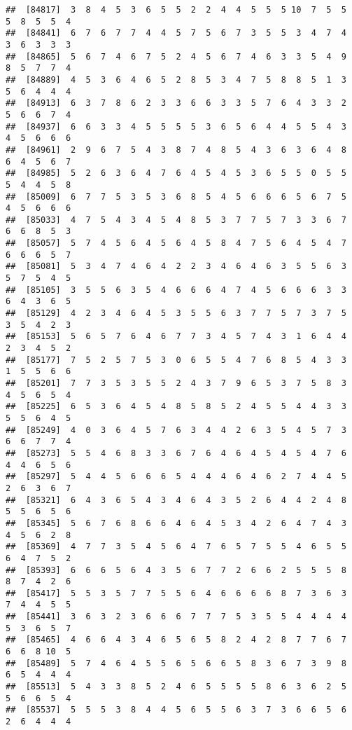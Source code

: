 \documentclass[
]{book}
\begin{document}
\begin{verbatim}
##  [84817]  3  8  4  5  3  6  5  5  2  2  4  4  5  5  5 10  7  5  5  5  8  5  5  4
##  [84841]  6  7  6  7  7  4  4  5  7  5  6  7  3  5  5  3  4  7  4  3  6  3  3  3
##  [84865]  5  6  7  4  6  7  5  2  4  5  6  7  4  6  3  3  5  4  9  8  5  7  7  4
##  [84889]  4  5  3  6  4  6  5  2  8  5  3  4  7  5  8  8  5  1  3  5  6  4  4  4
##  [84913]  6  3  7  8  6  2  3  3  6  6  3  3  5  7  6  4  3  3  2  5  6  6  7  4
##  [84937]  6  6  3  3  4  5  5  5  5  3  6  5  6  4  4  5  5  4  3  4  5  6  6  6
##  [84961]  2  9  6  7  5  4  3  8  7  4  8  5  4  3  6  3  6  4  8  6  4  5  6  7
##  [84985]  5  2  6  3  6  4  7  6  4  5  4  5  3  6  5  5  0  5  5  5  4  4  5  8
##  [85009]  6  7  7  5  3  5  3  6  8  5  4  5  6  6  6  5  6  7  5  4  5  6  6  6
##  [85033]  4  7  5  4  3  4  5  4  8  5  3  7  7  5  7  3  3  6  7  6  6  8  5  3
##  [85057]  5  7  4  5  6  4  5  6  4  5  8  4  7  5  6  4  5  4  7  6  6  6  5  7
##  [85081]  5  3  4  7  4  6  4  2  2  3  4  6  4  6  3  5  5  6  3  5  7  5  4  5
##  [85105]  3  5  5  6  3  5  4  6  6  6  4  7  4  5  6  6  6  3  3  6  4  3  6  5
##  [85129]  4  2  3  4  6  4  5  3  5  5  6  3  7  7  5  7  3  7  5  3  5  4  2  3
##  [85153]  5  6  5  7  6  4  6  7  7  3  4  5  7  4  3  1  6  4  4  2  3  4  5  2
##  [85177]  7  5  2  5  7  5  3  0  6  5  5  4  7  6  8  5  4  3  3  1  5  5  6  6
##  [85201]  7  7  3  5  3  5  5  2  4  3  7  9  6  5  3  7  5  8  3  4  5  6  5  4
##  [85225]  6  5  3  6  4  5  4  8  5  8  5  2  4  5  5  4  4  3  3  5  5  6  4  5
##  [85249]  4  0  3  6  4  5  7  6  3  4  4  2  6  3  5  4  5  7  3  6  6  7  7  4
##  [85273]  5  5  4  6  8  3  3  6  7  6  4  6  4  5  4  5  4  7  6  4  4  6  5  6
##  [85297]  5  4  4  5  6  6  6  5  4  4  4  6  4  6  2  7  4  4  5  2  6  3  6  7
##  [85321]  6  4  3  6  5  4  3  4  6  4  3  5  2  6  4  4  2  4  8  5  5  6  5  6
##  [85345]  5  6  7  6  8  6  6  4  6  4  5  3  4  2  6  4  7  4  3  4  5  6  2  8
##  [85369]  4  7  7  3  5  4  5  6  4  7  6  5  7  5  5  4  6  5  5  6  4  7  5  2
##  [85393]  6  6  6  5  6  4  3  5  6  7  7  2  6  6  2  5  5  5  8  8  7  4  2  6
##  [85417]  5  5  3  5  7  7  5  5  6  4  6  6  6  6  8  7  3  6  3  7  4  4  5  5
##  [85441]  3  6  3  2  3  6  6  6  7  7  7  5  3  5  5  4  4  4  4  5  3  6  5  7
##  [85465]  4  6  6  4  3  4  6  5  6  5  8  2  4  2  8  7  7  6  7  6  6  8 10  5
##  [85489]  5  7  4  6  4  5  5  6  5  6  6  5  8  3  6  7  3  9  8  6  5  4  4  4
##  [85513]  5  4  3  3  8  5  2  4  6  5  5  5  5  8  6  3  6  2  5  5  6  6  5  4
##  [85537]  5  5  5  3  8  4  4  5  6  5  5  6  3  7  3  6  6  5  6  2  6  4  4  4

\end{verbatim}
\end{document}
